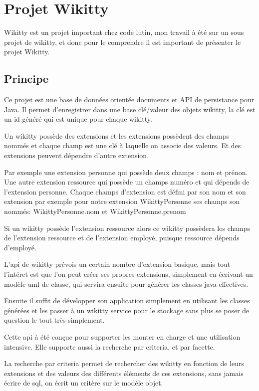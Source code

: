 \section{Projet Wikitty}

Wikitty est un projet important chez code lutin, mon travail à été sur un sous
projet de wikitty, et donc pour le comprendre il est important de présenter
le projet Wikitty.


\subsection{Principe}

Ce projet est une base de données orientée documents et API de persistance pour
Java. Il permet d'enregistrer dans une base clé/valeur des objets wikitty, la
clé est un id généré qui est unique pour chaque wikitty. 

Un wikitty possède des extensions et les extensions possèdent des champs nommés
et chaque champ est une clé à laquelle on associe des valeurs. Et des extensions
peuvent dépendre d'autre extension.

Par exemple une extension personne qui possède deux champs : nom et prénon.
Une autre extension ressource qui possède un champs numéro et qui dépends de
l'extension personne. Chaque champs d'extension est défini par son nom et son 
extension par exemple pour notre extension WikittyPersonne ses champs son nommés:
WikittyPersonne.nom et WikittyPersonne.prenom


Si un wikitty possède l'extension ressource alors ce wikitty possèdera les
champs de l'extension ressource et de l'extension employé, puisque ressource
dépends d'employé.

L'api de wikitty prévois un certain nombre d'extension basique, mais tout
l'intéret est que l'on peut créer ses propres extensions, simplement en écrivant
un modèle uml de classe, qui servira ensuite pour générer les classes java
effectives.

Ensuite il suffit de développer son application simplement en utilisant les
classes générées et les passer à un wikitty service pour le stockage sans plus
se poser de question le tout très simplement.

Cette api à été conçue pour supporter les monter en charge et une utilisation
intensive. Elle supporte aussi la recherche par criteria, et par facette.

La recherche par criteria permet de rechercher des wikitty en fonction de leurs
extensions et des valeurs des différents éléments de ces extensions, sans jamais
écrire de sql, on écrit un critère sur le modèle objet. 

